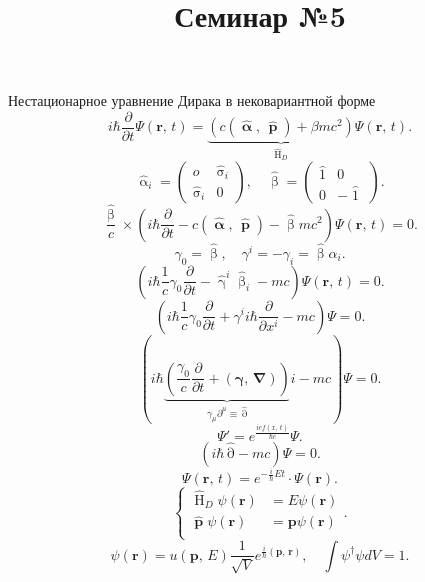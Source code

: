 \documentclass[a4paper]{article}
\title{Семинар №5}
\begin{document}
	\maketitle
	Нестационарное уравнение Дирака в нековариантной форме
\[
	i \hbar \frac{\partial }{\partial t} \Psi\left( \mathbf{r},\,t \right) =
	\underbrace{\left( c(\widehat{\operatorname{\boldsymbol{\alpha}}},\, \widehat{\operatorname{\mathbf{p}}})+\beta m c^2 \right)}_{\widehat{\operatorname{H}}_D} \Psi( \mathbf{r},\,t)
.\] 
\[
	\widehat{\operatorname{\alpha}}_i= \begin{pmatrix} o & \widehat{\operatorname{\sigma}}_i\\
	\widehat{\operatorname{\sigma}}_i & 0\end{pmatrix},\quad
	\widehat{\operatorname{\beta}}= \begin{pmatrix} 
	\widehat{\operatorname{1}}& 0\\
0 & -\widehat{\operatorname{1}}\end{pmatrix} 
.\] 
\[
\frac{\widehat{\operatorname{\beta}}}{c}\times
\left( i \hbar \frac{\partial }{\partial t} -c \left( 
\widehat{\operatorname{\boldsymbol{\alpha}}},\, \widehat{\operatorname{\mathbf{p}}}\right) -\widehat{\operatorname{\beta}} m c^2 \right) 
\Psi \left( \mathbf{r},\,t \right) =0
.\] 
\[
\gamma_0= \widehat{\operatorname{\beta}},\quad
\gamma^i=- \gamma_i = \widehat{\operatorname{\beta}} \alpha_i
.\] 
\[
	\left( i\hbar \frac{1}{c} \gamma_0 \frac{\partial }{\partial t} - \widehat{\operatorname{\gamma}}^i\widehat{\operatorname{\beta}}_i -mc\right) \Psi(\mathbf{r},\,t)=0
.\] 
\[
	\left( i \hbar \frac{1}{c} \gamma_0 \frac{\partial }{\partial t} + \gamma^i i\hbar \frac{\partial }{\partial x^i}-mc  \right) \Psi=0
.\] 
\[
\left( i\hbar \underbrace{\left( \frac{\gamma_0}{c}\frac{\partial }{\partial t} + \left( \boldsymbol{\gamma},\,\boldsymbol{\nabla} \right)  \right) }_{\gamma_\mu \partial^\mu\equiv \widehat{\operatorname{\partial}}}
i-mc \right)\Psi=0 .\] 
\[
	\Psi'= e^{\frac{ie f(x,\,t)}{\hbar c}}\Psi
.\] 
\[
	\left( i\hbar \widehat{\operatorname{\partial}}-mc \right) 
	\Psi=0
.\] 
\[
	\Psi(\mathbf{r},\,t)= e^{- \frac{i}{\hbar }E t}\cdot
	\Psi (\mathbf{r})
.\] 
\[
\left\{
\begin{aligned}
	\widehat{\operatorname{H}}_D \psi(\mathbf{r})&= E\psi(\mathbf{r}) \\
	\widehat{\operatorname{\mathbf{p}}}\psi(\mathbf{r})&= 
	\mathbf{p} \psi(\mathbf{r})\\
\end{aligned}
\right.
.\] 
\[
	\psi(\mathbf{r})= u(\mathbf{p},\,E)\frac{1}{\sqrt{V} }
	e^{\frac{i}{\hbar }\left( \mathbf{p},\,\mathbf{r} \right) },
	\quad \int \psi^\dagger \psi dV=1
.\] 
\end{document}
